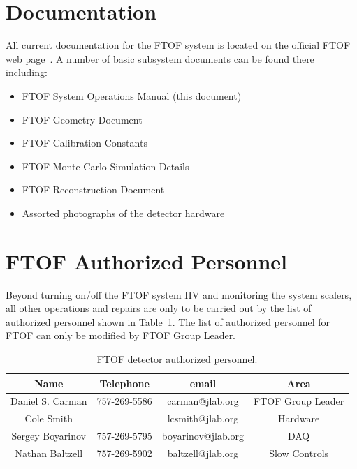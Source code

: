 \documentclass[letterpaper,10pt]{article}
\begin{document}
\clearpage

\vfil
\eject

\section{Documentation}

All current documentation for the FTOF system is located on the official FTOF web page~\cite{ftof-web}. 
A number of basic subsystem documents can be found there including:

\begin{itemize}
\item FTOF System Operations Manual (this document)
\item FTOF Geometry Document
\item FTOF Calibration Constants
\item FTOF Monte Carlo Simulation Details
\item FTOF Reconstruction Document
\item Assorted photographs of the detector hardware
\end{itemize}

\section{FTOF Authorized Personnel}
\label{personnel}

Beyond turning on/off the FTOF system HV and monitoring the system scalers, all other operations and
repairs are only to be carried out by the list of authorized personnel shown in Table~\ref{expert-list}.
The list of authorized personnel for FTOF can only be modified by FTOF Group Leader.

\begin{table}[htbp]
\begin{center}
\begin{tabular} {|c|c|c|c|} \hline
Name             & Telephone    & email              & Area             \\ \hline \hline
Daniel S. Carman & 757-269-5586 & carman@jlab.org    & FTOF Group Leader\\ \hline
Cole Smith       &              & lcsmith@jlab.org   & Hardware         \\ \hline
Sergey Boyarinov & 757-269-5795 & boyarinov@jlab.org & DAQ              \\ \hline
Nathan Baltzell  & 757-269-5902 & baltzell@jlab.org  & Slow Controls    \\ \hline
\end{tabular}
\caption{FTOF detector authorized personnel.}
\label{expert-list}
\end{center}
\end{table}
\end{document}
